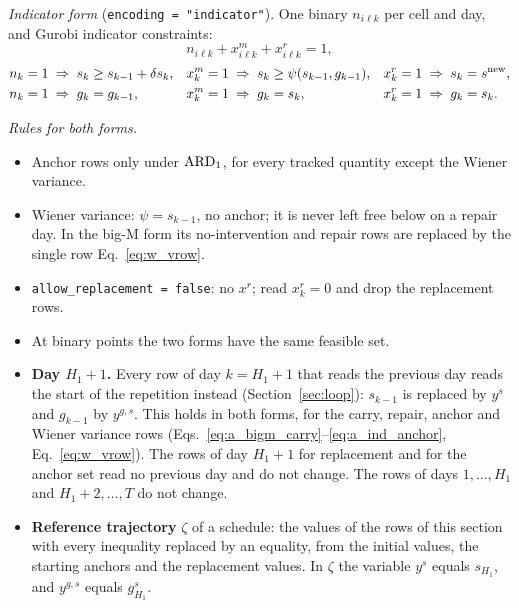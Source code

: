 \emph{Indicator form} (\texttt{encoding = "indicator"}). One binary $n_{i\ell k}$ per
cell and day, and Gurobi indicator constraints:
\begin{equation}
  n_{i\ell k} + x^m_{i\ell k} + x^r_{i\ell k} = 1 ,
  \label{eq:a_ind_sum}
\end{equation}
\begin{align}
  n_k = 1 &\;\Rightarrow\; s_k \geq s_{k-1} + \delta s_k, &
  x^m_k = 1 &\;\Rightarrow\; s_k \geq \psi(s_{k-1}, g_{k-1}), &
  x^r_k = 1 &\;\Rightarrow\; s_k = s^{\mathrm{new}}, \label{eq:a_ind_state} \\
  n_k = 1 &\;\Rightarrow\; g_k = g_{k-1}, &
  x^m_k = 1 &\;\Rightarrow\; g_k = s_k, &
  x^r_k = 1 &\;\Rightarrow\; g_k = s_k. \label{eq:a_ind_anchor}
\end{align}

\emph{Rules for both forms.}
\begin{itemize}[nosep,leftmargin=1.5em]
  \item Anchor rows only under $\mathrm{ARD}_{1}$, for every tracked quantity except the Wiener
        variance.
  \item Wiener variance: $\psi = s_{k-1}$, no anchor; it is never left free below on
        a repair day. In the big-M form its no-intervention and repair rows are
        replaced by the single row Eq.~\eqref{eq:w_vrow}.
  \item \texttt{allow\_replacement = false}: no $x^r$; read $x^r_k = 0$ and drop the
        replacement rows.
  \item At binary points the two forms have the same feasible set.
  \item \textbf{Day $H_1 + 1$.} Every row of day $k = H_1 + 1$ that reads the previous
        day reads the start of the repetition instead (Section~\ref{sec:loop}):
        $s_{k-1}$ is replaced by $y^s$ and $g_{k-1}$ by $y^{g,s}$. This holds in both
        forms, for the carry, repair, anchor and Wiener variance rows
        (Eqs.~\eqref{eq:a_bigm_carry}--\eqref{eq:a_ind_anchor}, Eq.~\eqref{eq:w_vrow}).
        The rows of day $H_1 + 1$ for replacement and for the anchor set read no
        previous day and do not change. The rows of days $1, \ldots, H_1$ and
        $H_1 + 2, \ldots, T$ do not change.
  \item \textbf{Reference trajectory} $\zeta$ of a schedule: the values of the rows of this section with every inequality replaced by an equality, from the initial values, the starting anchors and the replacement values. In $\zeta$ the variable $y^s$ equals $s_{H_1}$, and $y^{g,s}$ equals $g^s_{H_1}$.
\end{itemize}

